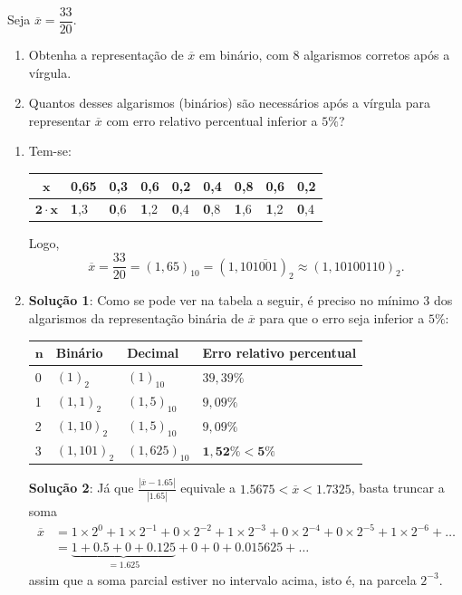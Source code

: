 \documentclass[12pt,a4paper]{article}
\begin{document}
\begin{ExerciseList}
\Exercise[title={2,5}] Seja $\overline{x} = \dfrac{33}{20}$.
\begin{enumerate}
\item Obtenha a representação de $\overline{x}$ em binário, com 8 algarismos corretos após a vírgula.
\item Quantos desses algarismos (binários) são necessários após a vírgula para representar $\overline{x}$ com erro relativo percentual inferior a $5\%$?
\end{enumerate}
\Answer
\begin{enumerate}
\item Tem-se:
\begin{center}
\begin{tabular}{|c|l|l|l|l|l|l|l|l|}
\hline
$\mathbf{x}$       
& 0,65 & 0,3 & 0,6 & 0,2 & 0,4 & 0,8 & 0,6 & 0,2 \\ \hline
$\mathbf{2\cdot x}$
& \textbf{1},3  & \textbf{0},6 & \textbf{1},2 & \textbf{0},4 & \textbf{0},8 & \textbf{1},6 & \textbf{1},2 & \textbf{0},4 \\ \hline
\end{tabular}
\end{center}

Logo,
\[
\overline{x}
= \dfrac{33}{20}
= (1,65)_{10}
= (1,10\overline{1001})_2
\approx (1,10100110)_2.
\]
\item \textbf{Solução 1}: Como se pode ver na tabela a seguir, é preciso no mínimo 3 dos algarismos da representação binária de $\overline{x}$ para que o erro seja inferior a $5\%$:
\medskip
\begin{center}
\begin{tabular}{|l|l|l|l|}
\hline
  $\mathbf{n}$
& \textbf{Binário}
& \textbf{Decimal}
& \textbf{Erro relativo percentual} \\ \hline
0 & $(1)_2$     & $(1)_{10}$ & $39,39\%$ \\ \hline
1 & $(1,1)_2$   & $(1,5)_{10}$ & $9,09\%$ \\ \hline
2 & $(1,10)_2$  & $(1,5)_{10}$ & $9,09\%$ \\ \hline
3 & $(1,101)_2$ & $(1,625)_{10}$ & $\mathbf{1,52\% < 5\%}$ \\ \hline
\end{tabular}
\end{center}
\textbf{Solução 2}: Já que $\frac{|\overline{x} - 1.65|}{|1.65|}$ equivale a $1.5675< \overline{x} < 1.7325$, basta truncar a soma
\begin{align*}
\overline{x} & =
  1 \times 2^0
+ 1 \times 2^{-1}
+ 0 \times 2^{-2}
+ 1 \times 2^{-3}
+ 0 \times 2^{-4}
+ 0 \times 2^{-5}
+ 1 \times 2^{-6}
+ \ldots \\
& =
  \underbrace{1
+ 0.5
+ 0
+ 0.125}_{=1.625}
+ 0
+ 0
+ 0.015625
+ \ldots
\end{align*}
assim que a soma parcial estiver no intervalo acima, isto é, na parcela $2^{-3}$.
\end{enumerate}


\end{ExerciseList}
\end{document}
